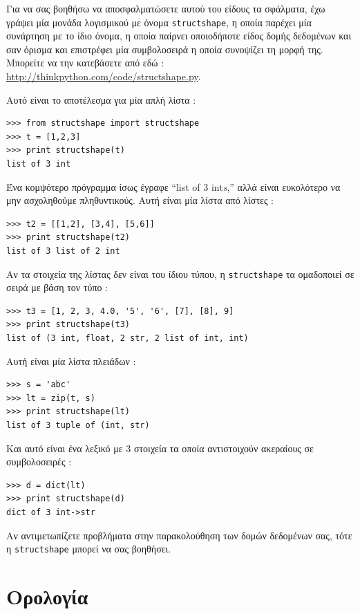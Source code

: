 \documentclass[10pt]{book}
\begin{document}

Για να σας βοηθήσω να αποσφαλματώσετε αυτού του είδους τα σφάλματα, έχω γράψει μία μονάδα λογισμικού με όνομα  {\tt structshape},  η οποία παρέχει μία συνάρτηση με το ίδιο όνομα, η οποία παίρνει οποιοδήποτε είδος δομής δεδομένων και σαν όρισμα και επιστρέφει μία συμβολοσειρά η οποία συνοψίζει τη μορφή της. Μπορείτε να την κατεβάσετε από εδώ : \url{http://thinkpython.com/code/structshape.py}.

 Αυτό είναι το αποτέλεσμα για μία απλή λίστα :

\begin{verbatim}
>>> from structshape import structshape
>>> t = [1,2,3]
>>> print structshape(t)
list of 3 int
\end{verbatim}
%
 Ένα κομψότερο πρόγραμμα ίσως έγραφε  ``list of 3 int{\em s},''  αλλά είναι ευκολότερο να μην ασχοληθούμε πληθυντικούς. Αυτή είναι μία λίστα από λίστες :

\begin{verbatim}
>>> t2 = [[1,2], [3,4], [5,6]]
>>> print structshape(t2)
list of 3 list of 2 int
\end{verbatim}
%
 Αν τα στοιχεία της λίστας δεν είναι του ίδιου τύπου, η  {\tt structshape}  τα ομαδοποιεί σε σειρά με 
βάση τον τύπο :

\begin{verbatim}
>>> t3 = [1, 2, 3, 4.0, '5', '6', [7], [8], 9]
>>> print structshape(t3)
list of (3 int, float, 2 str, 2 list of int, int)
\end{verbatim}
%
 Αυτή είναι μία λίστα πλειάδων :

\begin{verbatim}
>>> s = 'abc'
>>> lt = zip(t, s)
>>> print structshape(lt)
list of 3 tuple of (int, str)
\end{verbatim}
%
 Και αυτό είναι ένα λεξικό με 3 στοιχεία τα οποία αντιστοιχούν ακεραίους σε συμβολοσειρές :

\begin{verbatim}
>>> d = dict(lt)
>>> print structshape(d)
dict of 3 int->str
\end{verbatim}
%
 Αν αντιμετωπίζετε προβλήματα στην παρακολούθηση των δομών δεδομένων σας, τότε η  {\tt structshape}  μπορεί να σας βοηθήσει.



\section{Ορολογία}
\end{document}
